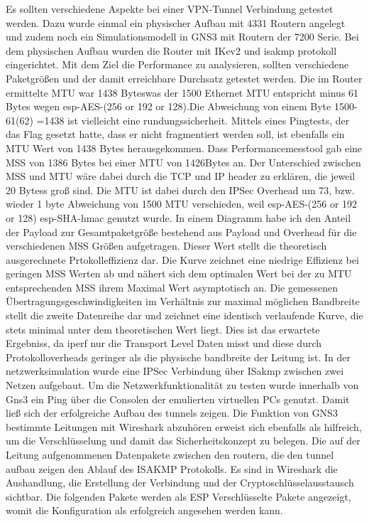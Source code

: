 \documentclass[english,runningheads,a4paper]{llncs}[2018/03/10]
\begin{document}
Es sollten verschiedene Aspekte bei einer VPN-Tunnel Verbindung getestet werden. Dazu wurde einmal ein physischer Aufbau mit 4331 Routern angelegt und zudem noch ein Simulationsmodell in GNS3 mit Routern der 7200 Serie. Bei dem physischen Aufbau wurden die Router mit IKev2 und isakmp protokoll eingerichtet. Mit dem Ziel die Performance zu analysieren, sollten verschiedene Paketgrößen und der damit erreichbare Durchsatz getestet werden. Die im Router ermittelte MTU war 1438 Byteswas der 1500 Ethernet MTU entspricht minus 61 Bytes wegen esp-AES-(256
or 192 or 128).Die Abweichung von einem Byte 1500-61(62) =1438 ist vielleicht eine rundungssicherheit. Mittels eines Pingtests, der das Flag gesetzt hatte, dass er nicht fragmentiert werden soll, ist ebenfalls ein MTU Wert von 1438 Bytes herausgekommen. Dass Performancemesstool  gab eine MSS von 1386 Bytes bei einer MTU von 1426Bytes an. Der Unterschied zwischen MSS und MTU wäre dabei durch die TCP und IP header zu erklären, die jeweil 20 Bytess groß sind. Die MTU ist dabei durch den IPSec Overhead um 73, bzw. wieder 1 byte Abweichung
von 1500 MTU verschieden, weil esp-AES-(256 or 192 or 128) esp-SHA-hmac
genutzt wurde. In einem Diagramm habe ich den Anteil der Payload zur Gesamtpaketgröße bestehend aus Payload und Overhead für die verschiedenen MSS Größen aufgetragen. Dieser Wert stellt die theoretisch ausgerechnete Prtokolleffizienz dar. Die Kurve zeichnet eine niedrige Effizienz bei geringen MSS Werten ab und nähert sich dem optimalen Wert bei der zu MTU entsprechenden MSS ihrem Maximal Wert asymptotisch an. Die gemessenen Übertragungsgeschwindigkeiten im Verhältnis zur maximal möglichen Bandbreite stellt die zweite Datenreihe dar und zeichnet eine identisch verlaufende Kurve, die stets minimal unter dem theoretischen Wert liegt. Dies ist das erwartete Ergebniss, da iperf nur die Transport Level Daten misst und diese durch Protokolloverheads geringer als die physische bandbreite der Leitung ist.
In der netzwerksimulation wurde eine IPSec Verbindung über ISakmp zwischen zwei Netzen aufgebaut. Um die Netzwerkfunktionalität zu testen wurde innerhalb von Gns3 ein Ping über die Consolen der emulierten virtuellen PCs genutzt. Damit ließ sich der erfolgreiche Aufbau des tunnels zeigen. Die Funktion von GNS3 bestimmte Leitungen mit Wireshark abzuhören erweist sich ebenfalls als hilfreich, um die Verschlüsselung und damit das Sicherheitskonzept zu belegen. Die auf der Leitung aufgenommenen Datenpakete zwischen den routern, die den tunnel aufbau zeigen den Ablauf des ISAKMP Protokolls. Es sind in Wireshark die Aushandlung, die Erstellung der Verbindung und der Cryptoschlüsselausstausch sichtbar. Die folgenden Pakete werden als ESP Verschlüsselte Pakete angezeigt, womit die Konfiguration als erfolgreich angesehen werden kann.
\end{document}
